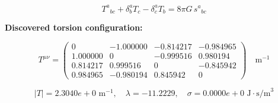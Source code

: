 
\begin{equation}
  T^a{}_{bc} + \delta^a_b T_c - \delta^a_c T_b = 8\pi G \, s^a{}_{bc}
\end{equation}

\textbf{Discovered torsion configuration:}

\begin{equation}
  T^{\mu\nu} = \begin{pmatrix}
    0 & -1.000000 & -0.814217 & -0.984965 \\
    1.000000 & 0 & -0.999516 & 0.980194 \\
    0.814217 & 0.999516 & 0 & -0.845942 \\
    0.984965 & -0.980194 & 0.845942 & 0
  \end{pmatrix} \quad \text{m}^{-1}
\end{equation}

\begin{equation}
  |T| = 2.3040e+0 \text{ m}^{-1}, \quad
  \lambda = -11.2229, \quad
  \sigma = 0.0000e+0 \text{ J}\cdot\text{s/m}^3
\end{equation}